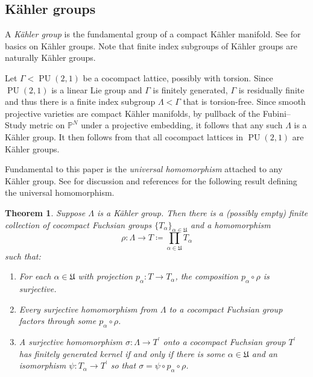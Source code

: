 \documentclass[11pt]{article}
\theoremstyle{plain}
\newtheorem{thm}{Theorem}[section]
\theoremstyle{definition}
\theoremstyle{remark}
\newcommand{\bbP}{\mathbb{P}}
\newcommand{\frakU}{\mathfrak{U}}
\newcommand{\al}{\alpha}
\newcommand{\Gam}{\Gamma}
\newcommand{\Lam}{\Lambda}
\newcommand{\sig}{\sigma}
\DeclareMathOperator{\PU}{PU}
\newcommand{\lra}{\longrightarrow}
\newenvironment{enum}{\begin{enumerate}}{\end{enumerate}}
\begin{document}
\subsection{K\"ahler groups}\label{ssec:KahlerGroups}

A \emph{K\"ahler group} is the fundamental group of a compact K\"ahler manifold. See \cite{KahlerBook, Py} for basics on K\"ahler groups. Note that finite index subgroups of K\"ahler groups are naturally K\"ahler groups.

Let $\Gam < \PU(2,1)$ be a cocompact lattice, possibly with torsion. Since $\PU(2,1)$ is a linear Lie group and $\Gam$ is finitely generated, $\Gam$ is residually finite and thus there is a finite index subgroup $\Lam < \Gam$ that is torsion-free. Since smooth projective varieties are compact K\"ahler manifolds, by pullback of the Fubini--Study metric on $\bbP^N$ under a projective embedding, it follows that any such $\Lam$ is a K\"ahler group. It then follows from \cite[Lem.\ 1.1.15]{KahlerBook} that all cocompact lattices in $\PU(2,1)$ are K\"ahler groups.

\medskip

Fundamental to this paper is the \emph{universal homomorphism} attached to any K\"ahler group. See \cite[\S 2.C]{HLPSV} for discussion and references for the following result defining the universal homomorphism.

\begin{thm}\label{thm:Universal}
Suppose $\Lam$ is a K\"ahler group. Then there is a (possibly empty) finite collection of cocompact Fuchsian groups $\{T_\al\}_{\al \in \frakU}$ and a homomorphism
\begin{equation}\label{eq:UniversalHom}
\rho : \Lam \lra T \coloneqq \prod_{\al \in \frakU} T_\al
\end{equation}
such that:
\begin{enum}

\item For each $\al \in \frakU$ with projection $p_\al : T \to T_\al$, the composition $p_\al \circ \rho$ is surjective.

\item Every surjective homomorphism from $\Lam$ to a cocompact Fuchsian group factors through some $p_\al \circ \rho$.

\item A surjective homomorphism $\sig : \Lam \to T^\prime$ onto a cocompact Fuchsian group $T^\prime$ has finitely generated kernel if and only if there is some $\al \in \frakU$ and an isomorphism $\psi : T_\al \to T^\prime$ so that $\sig = \psi \circ p_\al \circ \rho$.

\end{enum}
\end{thm}
\end{document}

